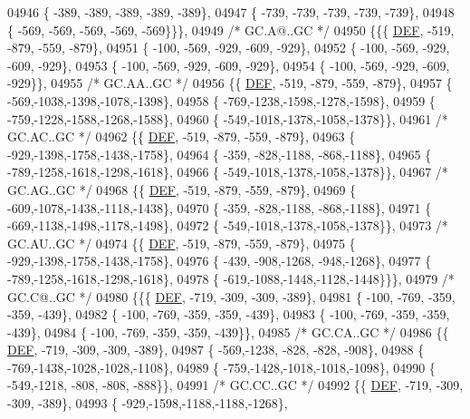 \begin{DoxyCode}
04946 \{ -389, -389, -389, -389, -389\},
04947 \{ -739, -739, -739, -739, -739\},
04948 \{ -569, -569, -569, -569, -569\}\}\},
04949 \textcolor{comment}{/* GC.A@..GC */}
04950 \{\{\{  \mbox{\hyperlink{1_88_84__epars_8h_a397419fc12b37ed479c8abb9d444d843}{DEF}}, -519, -879, -559, -879\},
04951 \{ -100, -569, -929, -609, -929\},
04952 \{ -100, -569, -929, -609, -929\},
04953 \{ -100, -569, -929, -609, -929\},
04954 \{ -100, -569, -929, -609, -929\}\},
04955 \textcolor{comment}{/* GC.AA..GC */}
04956 \{\{  \mbox{\hyperlink{1_88_84__epars_8h_a397419fc12b37ed479c8abb9d444d843}{DEF}}, -519, -879, -559, -879\},
04957 \{ -569,-1038,-1398,-1078,-1398\},
04958 \{ -769,-1238,-1598,-1278,-1598\},
04959 \{ -759,-1228,-1588,-1268,-1588\},
04960 \{ -549,-1018,-1378,-1058,-1378\}\},
04961 \textcolor{comment}{/* GC.AC..GC */}
04962 \{\{  \mbox{\hyperlink{1_88_84__epars_8h_a397419fc12b37ed479c8abb9d444d843}{DEF}}, -519, -879, -559, -879\},
04963 \{ -929,-1398,-1758,-1438,-1758\},
04964 \{ -359, -828,-1188, -868,-1188\},
04965 \{ -789,-1258,-1618,-1298,-1618\},
04966 \{ -549,-1018,-1378,-1058,-1378\}\},
04967 \textcolor{comment}{/* GC.AG..GC */}
04968 \{\{  \mbox{\hyperlink{1_88_84__epars_8h_a397419fc12b37ed479c8abb9d444d843}{DEF}}, -519, -879, -559, -879\},
04969 \{ -609,-1078,-1438,-1118,-1438\},
04970 \{ -359, -828,-1188, -868,-1188\},
04971 \{ -669,-1138,-1498,-1178,-1498\},
04972 \{ -549,-1018,-1378,-1058,-1378\}\},
04973 \textcolor{comment}{/* GC.AU..GC */}
04974 \{\{  \mbox{\hyperlink{1_88_84__epars_8h_a397419fc12b37ed479c8abb9d444d843}{DEF}}, -519, -879, -559, -879\},
04975 \{ -929,-1398,-1758,-1438,-1758\},
04976 \{ -439, -908,-1268, -948,-1268\},
04977 \{ -789,-1258,-1618,-1298,-1618\},
04978 \{ -619,-1088,-1448,-1128,-1448\}\}\},
04979 \textcolor{comment}{/* GC.C@..GC */}
04980 \{\{\{  \mbox{\hyperlink{1_88_84__epars_8h_a397419fc12b37ed479c8abb9d444d843}{DEF}}, -719, -309, -309, -389\},
04981 \{ -100, -769, -359, -359, -439\},
04982 \{ -100, -769, -359, -359, -439\},
04983 \{ -100, -769, -359, -359, -439\},
04984 \{ -100, -769, -359, -359, -439\}\},
04985 \textcolor{comment}{/* GC.CA..GC */}
04986 \{\{  \mbox{\hyperlink{1_88_84__epars_8h_a397419fc12b37ed479c8abb9d444d843}{DEF}}, -719, -309, -309, -389\},
04987 \{ -569,-1238, -828, -828, -908\},
04988 \{ -769,-1438,-1028,-1028,-1108\},
04989 \{ -759,-1428,-1018,-1018,-1098\},
04990 \{ -549,-1218, -808, -808, -888\}\},
04991 \textcolor{comment}{/* GC.CC..GC */}
04992 \{\{  \mbox{\hyperlink{1_88_84__epars_8h_a397419fc12b37ed479c8abb9d444d843}{DEF}}, -719, -309, -309, -389\},
04993 \{ -929,-1598,-1188,-1188,-1268\},

\end{DoxyCode}
